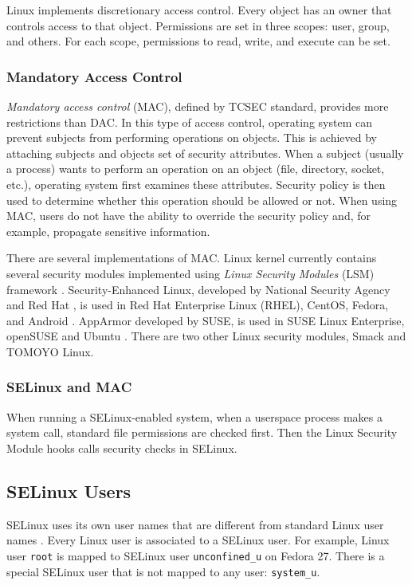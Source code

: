 Linux implements discretionary access control. Every object has an owner that
controls access to that object. Permissions are set in three scopes: user,
group, and others. For each scope, permissions to read, write, and execute can
be set.

\subsubsection{Mandatory Access Control}
\emph{Mandatory access control} (MAC), defined by TCSEC standard, provides more
restrictions than DAC. In this type of access control, operating system can
prevent subjects from performing operations on objects. This is achieved by
attaching subjects and objects set of security attributes. When a subject
(usually a process) wants to perform an operation on an object (file, directory,
socket, etc.), operating system first examines these attributes. Security
policy is then used to determine whether this operation should be allowed or
not. When using MAC, users do not have the ability to override the security
policy and, for example, propagate sensitive information.

There are several implementations of MAC. Linux kernel currently contains
several security modules implemented using \emph{Linux Security Modules} (LSM)
framework \cite{lsmusage}. Security-Enhanced Linux, developed by National
Security Agency and Red Hat \cite{selinuxcontr}, is used in Red Hat Enterprise
Linux (RHEL), CentOS, Fedora, and Android
\cite{selinuxguide,selinuxguidefedora,selinuxandroid}. AppArmor developed by
SUSE, is used in SUSE Linux Enterprise, openSUSE and Ubuntu
\cite{apparmor,apparmorubuntu}. There are two other Linux security modules,
Smack and TOMOYO Linux.

\subsubsection{SELinux and MAC}
When running a SELinux-enabled system, when a userspace process makes a system
call, standard file permissions are checked first. Then the Linux Security
Module hooks calls security checks in SELinux.

\subsection{SELinux Users}
\label{selinuxuser}
SELinux uses its own user names that are different from standard Linux user
names \cite[p.~24]{tsn}. Every Linux user is associated to a SELinux user. For
example, Linux user \texttt{root} is mapped to SELinux user
\texttt{unconfined\_u} on Fedora 27. There is a special SELinux user that is
not mapped to any user: \texttt{system\_u}.

